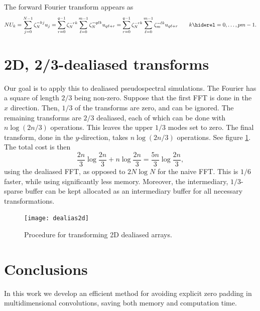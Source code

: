 \documentclass[final]{siamltex}
\def\be{\begin{dmath*}}
\def\ee{\end{dmath*}}
\def\no{\hiderel}
\begin{document}
The forward Fourier transform appears as
\be
NU_k=\sum_{j=0}^{N-1}\zeta_N^{-kj} u_j
=\sum_{r=0}^{q-1}\zeta_N^{-rk}\sum_{\ell=0}^{m-1}\zeta_N^{-q\ell k} u_{q\ell+r}
=\sum_{r=0}^{q-1}\zeta_N^{-rk}\sum_{\ell=0}^{m-1}\zeta_m^{-\ell k} u_{q\ell+r}
\qquad k\no =0,\ldots,pm-1.
\ee





\section{2D, 2/3-dealiased transforms}
Our goal is to apply this to dealiased pseudospectral simulations. 
The Fourier has a square of length $2/3$ being non-zero. Suppose that 
the first FFT is done in the $x$ direction.  Then, $1/3$ of the transforms
are zero, and can be ignored. The remaining transforms are $2/3$ dealiased,
each of which can be done with $n \log (2 n/3)$ operations. This leaves
the upper $1/3$ modes set to zero.  The final transform, done in the 
$y$-direction, takes $n \log(2 n/3)$ operations.  See figure \ref{dealias2d}.
The total cost is then
\be
\frac{2 n}{3} \log \frac{2 n}{3} +  n \log \frac{2 n}{3}
=\frac{5n}{3} \log \frac{2 n}{3},
\ee
using the dealiased FFT, as opposed to $2 N \log N$ for the naive FFT. This 
is $1/6$ faster, while using significantly less memory. Moreover, the
intermediary, $1/3$-sparse buffer can be kept allocated as an intermediary
buffer for all necessary transformations.
\begin{figure}[htbp]
  \begin{center}
    \texttt{[image: dealias2d]}
    \caption{Procedure for transforming 2D dealiased arrays.}
    \label{dealias2d}
  \end{center}
\end{figure}

\section{Conclusions}
In this work we develop an efficient method for avoiding explicit zero
padding in multidimensional convolutions, saving both memory and
computation time.


\end{document}
